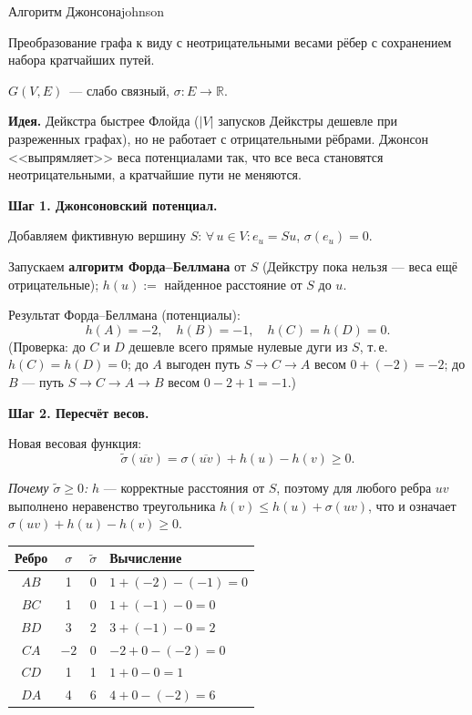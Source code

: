 \begin{algo}{Алгоритм Джонсона}{johnson}

Преобразование графа к виду с неотрицательными весами рёбер с сохранением набора кратчайших путей.

$G(V, E)$~--- слабо связный, $\sigma\colon E \to \mathbb{R}$.

\textbf{Идея.} Дейкстра быстрее Флойда ($|V|$ запусков Дейкстры дешевле
при разреженных графах), но не работает с отрицательными рёбрами.
Джонсон <<выпрямляет>> веса потенциалами так, что все веса становятся
неотрицательными, а кратчайшие пути не меняются.

\textbf{Шаг 1. Джонсоновский потенциал.}

Добавляем фиктивную вершину $S$: $\forall\, u \in V\colon e_u = Su$, $\sigma(e_u) = 0$.


Запускаем \textbf{алгоритм Форда--Беллмана} от $S$ (Дейкстру пока
нельзя --- веса ещё отрицательные); $h(u) :=$ найденное расстояние от
$S$ до $u$.

Результат Форда--Беллмана (потенциалы):
\[
  h(A) = -2, \quad h(B) = -1, \quad h(C) = h(D) = 0.
\]
(Проверка: до $C$ и $D$ дешевле всего прямые нулевые дуги из $S$, т.\,е.
$h(C) = h(D) = 0$; до $A$ выгоден путь $S \to C \to A$ весом
$0 + (-2) = -2$; до $B$ --- путь $S \to C \to A \to B$ весом
$0 - 2 + 1 = -1$.)

\textbf{Шаг 2. Пересчёт весов.}

Новая весовая функция:
\[
  \tilde{\sigma}(\overline{uv}) = \sigma(\overline{uv}) + h(u) - h(v) \geq 0.
\]

\textit{Почему $\tilde\sigma \ge 0$:} $h$ --- корректные расстояния от
$S$, поэтому для любого ребра $uv$ выполнено неравенство треугольника
$h(v) \le h(u) + \sigma(uv)$, что и означает
$\sigma(uv) + h(u) - h(v) \ge 0$.

\begin{center}
\begin{tabular}{c|c|c|l}
Ребро & $\sigma$ & $\tilde{\sigma}$ & Вычисление \\
\hline
$AB$ & 1 & 0 & $1 + (-2) - (-1) = 0$ \\
$BC$ & 1 & 0 & $1 + (-1) - 0 = 0$ \\
$BD$ & 3 & 2 & $3 + (-1) - 0 = 2$ \\
$CA$ & $-2$ & 0 & $-2 + 0 - (-2) = 0$ \\
$CD$ & 1 & 1 & $1 + 0 - 0 = 1$ \\
$DA$ & 4 & 6 & $4 + 0 - (-2) = 6$ \\
\end{tabular}
\end{center}


\end{algo}
